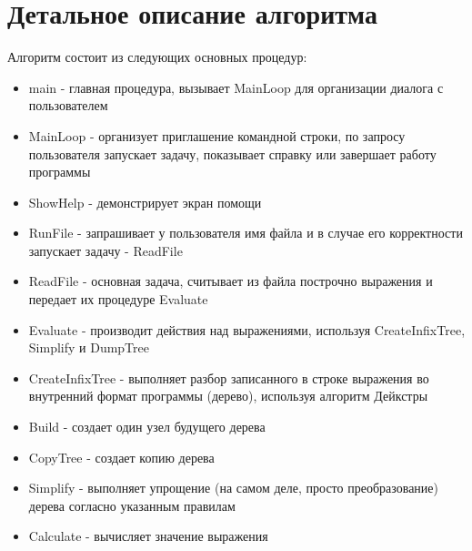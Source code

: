 \section{Детальное описание алгоритма}
\DeclareRobustCommand{\l}[1]{
\item {[}{\it #1}{]} 
}
Алгоритм состоит из следующих основных процедур:
\begin{itemize}
\item main - главная процедура, вызывает MainLoop для организации диалога с
пользователем
\item MainLoop - организует приглашение командной строки, по запросу пользователя
запускает задачу, показывает справку или завершает работу программы
\item ShowHelp - демонстрирует экран помощи
\item RunFile - запрашивает у пользователя имя файла и в случае его
корректности запускает задачу - ReadFile
\item ReadFile - основная задача, считывает из файла построчно выражения и
передает их процедуре Evaluate
\item Evaluate - производит действия над выражениями, используя
CreateInfixTree, Simplify и DumpTree
\item CreateInfixTree - выполняет разбор записанного в строке выражения во внутренний формат
программы (дерево), используя алгоритм Дейкстры
\item Build - создает один узел будущего дерева
\item CopyTree - создает копию дерева
\item Simplify - выполняет упрощение (на самом деле, просто преобразование)
дерева согласно указанным правилам 
\item Calculate - вычисляет значение выражения
\end{itemize}

